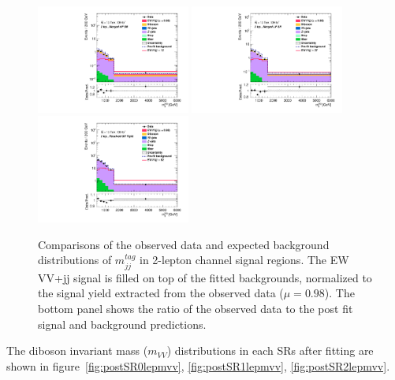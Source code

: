 \begin{figure}[]
    \centering
    \includegraphics[width=0.45\textwidth]{figures/PostFit/Region_distMTagMerJets_DSRVBSHP_BMin0_J0_incJet1_L2_T0_incFat1_Y6051_incTag1_Fat1_GlobalFit_unconditionnal_mu1log.pdf}
    \includegraphics[width=0.45\textwidth]{figures/PostFit/Region_distMTagMerJets_DSRVBSLP_BMin0_J0_incJet1_L2_T0_incFat1_Y6051_incTag1_Fat1_GlobalFit_unconditionnal_mu1log.pdf}
    \includegraphics[width=0.45\textwidth]{figures/PostFit/Region_distMTagResJets_DSRVBSFid_BMin0_T0_Y6051_incTag1_J2_L2_incJet1_GlobalFit_unconditionnal_mu1log.pdf}
    \caption{Comparisons of the observed data and expected background distributions of $m^{tag}_{jj}$ in 2-lepton channel signal regions. The EW VV+jj signal is filled on top of the fitted backgrounds, normalized to the signal yield extracted from the observed data ($\mu = 0.98$). The bottom panel shows the ratio of the observed data to the post fit signal and background predictions.}
    \label{fig:postSR2lepmtagjj}
\end{figure}
The diboson invariant mass ($m_{VV}$) distributions in each SRs after fitting are shown in figure~\ref{fig:postSR0lepmvv}, \ref{fig:postSR1lepmvv}, \ref{fig:postSR2lepmvv}. 
